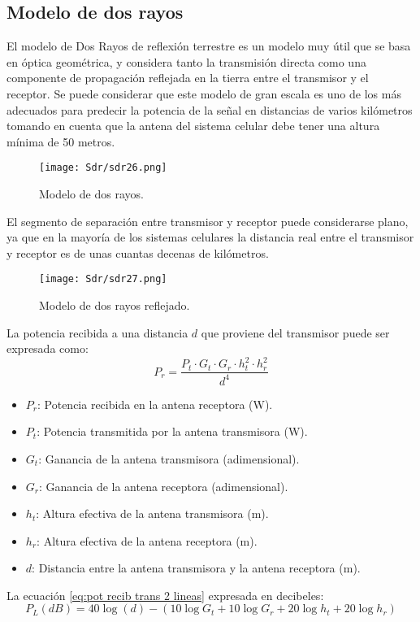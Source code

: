 \documentclass[
	12pt, %
	fleqn, %
	a4paper, %
	oneside, %
]{LegrandOrangeBook}
\begin{document}
\subsection{Modelo de dos rayos}
El modelo de Dos Rayos de reflexión terrestre es un modelo muy útil que se basa en óptica geométrica, y considera tanto la transmisión directa como una componente de propagación reflejada en la tierra entre el transmisor y el receptor. Se puede considerar que este modelo de gran escala es uno de los más adecuados para predecir la potencia de la señal en distancias de varios kilómetros tomando en cuenta que la antena del sistema celular debe tener una altura mínima de 50 metros.
\begin{figure}[H]
\centering
\texttt{[image: Sdr/sdr26.png]}
\caption{Modelo de dos rayos.}
\end{figure}
El segmento de separación entre transmisor y receptor puede considerarse plano, ya que en la mayoría de los sistemas celulares la distancia real entre el transmisor y receptor es de unas cuantas decenas de kilómetros.
\begin{figure}[H]
\centering
\texttt{[image: Sdr/sdr27.png]}
\caption{Modelo de dos rayos reflejado.}
\end{figure}
La potencia recibida a una distancia $d$ que proviene del transmisor puede ser expresada como:
\begin{equation}
P_r=\frac{P_t\cdot G_t\cdot G_r\cdot h_t^2\cdot h_r^2}{d^4}
\label{eq:pot recib trans 2 lineas}
\end{equation}
\begin{itemize}
\item $P_r$: Potencia recibida en la antena receptora (W).
\item $P_t$: Potencia transmitida por la antena transmisora (W).
\item $G_t$: Ganancia de la antena transmisora (adimensional).
\item $G_r$: Ganancia de la antena receptora (adimensional).
\item $h_t$: Altura efectiva de la antena transmisora (m).
\item $h_r$: Altura efectiva de la antena receptora (m).
\item $d$: Distancia entre la antena transmisora y la antena receptora (m).
\end{itemize}
La ecuación \ref{eq:pot recib trans 2 lineas} expresada en decibeles:
\begin{equation}
P_L (dB)=40\log (d)-(10\log G_t+10\log G_r+20\log h_t+20\log h_r)
\end{equation}
\end{document}
